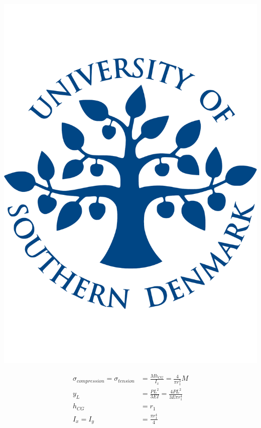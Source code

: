   \noindent\begin{minipage}{0.2\textwidth}%
      \includegraphics[width=\linewidth]{figures/sdu_logo.pdf}
  \end{minipage}%
  \hfill%
  \begin{minipage}{0.8\textwidth}
    \begin{equation}
    \begin{align*}
      \sigma _{compression} = \sigma _{tension} &= \frac{M h_{CG}}{I_x} = \frac{4}{\pi r_1 ^3} M\\
      y_L &= \frac{P L^2}{3EI} = \frac{4 P L^2}{3 E \pi r_1 ^4}\\
      h_{CG} &= r_1 \\
      I_x = I_y &= \frac{\pi r_1 ^4}{4}
      \end{align*}
    \end{equation}
  \end{minipage}

